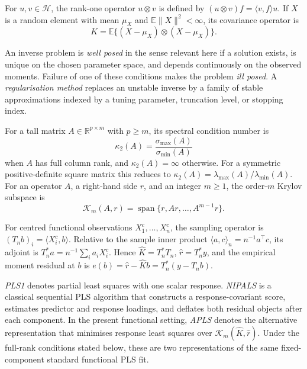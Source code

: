 \begin{definition}
For $u,v\in\mathcal H$, the rank-one operator $u\otimes v$ is defined by
$(u\otimes v)f=\langle v,f\rangle u$.  If $X$ is a random element with mean
$\mu_X$ and $\mathbb E\|X\|^2<\infty$, its covariance operator is
\[
    K=\mathbb E\{(X-\mu_X)\otimes(X-\mu_X)\}.
\]
\end{definition}

\begin{definition}
An inverse problem is \emph{well posed} in the sense relevant here if a
solution exists, is unique on the chosen parameter space, and depends
continuously on the observed moments.  Failure of one of these conditions
makes the problem \emph{ill posed}.  A \emph{regularisation method} replaces
an unstable inverse by a family of stable approximations indexed by a tuning
parameter, truncation level, or stopping index.
\end{definition}

\begin{definition}
For a tall matrix $A\in\mathbb R^{p\times m}$ with $p\geq m$, its spectral
condition number is
\[
    \kappa_2(A)=\frac{\sigma_{\max}(A)}{\sigma_{\min}(A)}
\]
when $A$ has full column rank, and $\kappa_2(A)=\infty$ otherwise.  For a
symmetric positive-definite square matrix this reduces to
$\kappa_2(A)=\lambda_{\max}(A)/\lambda_{\min}(A)$.  For an operator $A$, a
right-hand side $r$, and an integer $m\geq1$, the order-$m$ Krylov subspace is
\[
    \mathcal K_m(A,r)
    =\operatorname{span}\{r,Ar,\ldots,A^{m-1}r\}.
\]
\end{definition}

\begin{definition}
For centred functional observations $X_1^c,\ldots,X_n^c$, the sampling
operator is $(T_nb)_i=\langle X_i^c,b\rangle$.  Relative to the sample inner
product $\langle a,c\rangle_n=n^{-1}a^\top c$, its adjoint is
$T_n^*a=n^{-1}\sum_i a_iX_i^c$.  Hence
$\widehat K=T_n^*T_n$, $\widehat r=T_n^*y$, and the empirical moment residual
at $b$ is $e(b)=\widehat r-\widehat Kb=T_n^*(y-T_nb)$.
\end{definition}

\begin{definition}
\emph{PLS1} denotes partial least squares with one scalar response.
\emph{NIPALS} is a classical sequential PLS algorithm that constructs a
response-covariant score, estimates predictor and response loadings, and
deflates both residual objects after each component.  In the present
functional setting, \emph{APLS} denotes the alternative representation that
minimises response least squares over
$\mathcal K_m(\widehat K,\widehat r)$.  Under the full-rank conditions stated
below, these are two representations of the same fixed-component standard
functional PLS fit.
\end{definition}

